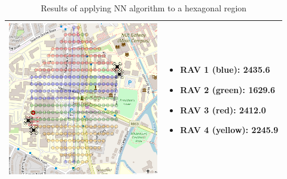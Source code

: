 \begin{table}[H]
\begin{tabular}{ | c | m{4.5cm} | }
    \begin{minipage}[c][69mm][c]{.55\textwidth}
      \includegraphics[width=\linewidth, height=67mm]{Chapters/MultiAgentCoverage/MultipleTravellingSalesman/Figs/Hexagon/FourRAV.PNG}
    \end{minipage}
    &
    \begin{itemize}[leftmargin=*]
    \item[] RAV 1 (blue): 2435.6
    \item[] RAV 2 (green): 1629.6
    \item[] RAV 3 (red): 2412.0
    \item[] RAV 4 (yellow): 2245.9
    \end{itemize}
    \\
    \hline
  \end{tabular}
  \caption{Results of applying NN algorithm to a hexagonal region}\label{table:NNAlgoResultsHex}
\end{table}




